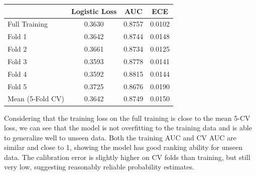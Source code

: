 \documentclass{article}
\begin{document}
\begin{probset}
\begin{prob}
\begin{subprobset}
\begin{subprob}
\begin{soln}
                \begin{center}
                    \begin{tabular}{lccc}
                        \hline
                        & Logistic Loss & AUC & ECE \\
                        \hline
                        Full Training & 0.3630 & 0.8757 & 0.0102 \\
                        Fold 1 & 0.3642 & 0.8744 & 0.0148 \\
                        Fold 2 & 0.3661 & 0.8734 & 0.0125 \\
                        Fold 3 & 0.3593 & 0.8778 & 0.0141 \\
                        Fold 4 & 0.3592 & 0.8815 & 0.0144 \\
                        Fold 5 & 0.3725 & 0.8676 & 0.0190 \\
                        Mean (5-Fold CV) & 0.3642 & 0.8749 & 0.0150 \\
                        \hline
                    \end{tabular}
                \end{center}

                Considering that the training loss on the full training is close to the mean 5-CV loss, we can see that the model is not overfitting to the training data and is able to generalize well to unseen data. Both the training AUC and CV AUC are similar and close to 1, showing the model has good ranking ability for unseen data. The calibration error is slightly higher on CV folds than training, but still very low, suggesting reasonably reliable probability estimates.
            \end{soln}
        \end{subprob}


\end{subprobset}
\end{prob}
\end{probset}
\end{document}
